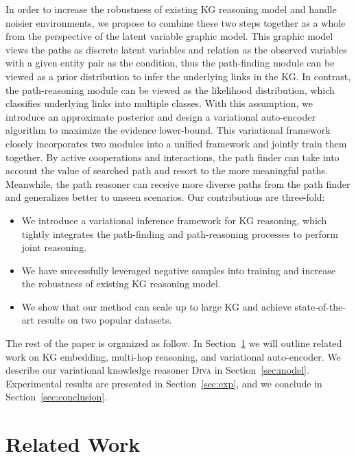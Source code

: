 \documentclass[11pt,a4paper]{article}
\begin{document}
In order to increase the robustness of existing KG reasoning model and handle noisier environments, we propose to combine these two steps together as a whole from the perspective of the latent variable graphic model. This graphic model views the paths as discrete latent variables and relation as the observed variables with a given entity pair as the condition, thus the path-finding module can be viewed as a prior distribution to infer the underlying links in the KG. In contrast, the path-reasoning module can be viewed as the likelihood distribution, which classifies underlying links into multiple classes. With this assumption, we introduce an approximate posterior and design a variational auto-encoder~\cite{kingma2013auto} algorithm to maximize the evidence lower-bound. This variational framework closely incorporates two modules into a unified framework and jointly train them together. By active cooperations and interactions, the path finder can take into account the value of searched path and resort to the more meaningful paths. Meanwhile, the path reasoner can receive more diverse paths from the path finder and generalizes better to unseen scenarios.
Our contributions are three-fold:
\begin{itemize}
\item We introduce a variational inference framework for KG reasoning, which tightly integrates the path-finding and path-reasoning processes to perform joint reasoning.
\item We have successfully leveraged negative samples into training and increase the robustness of existing KG reasoning model.
\item We show that our method can scale up to large KG and achieve state-of-the-art results on two popular datasets.
\end{itemize}

The rest of the paper is organized as follow. In Section~\ref{sec:related} we will outline related work on KG embedding, multi-hop reasoning, and variational auto-encoder. We describe our variational knowledge reasoner \textsc{Diva} in Section~\ref{sec:model}. Experimental results are presented in Section~\ref{sec:exp}, and we conclude in Section~\ref{sec:conclusion}.

\section{Related Work}
\label{sec:related}
\end{document}

